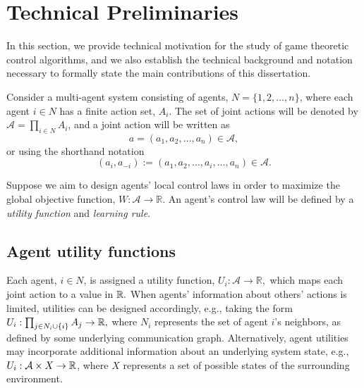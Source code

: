 


\section{Technical Preliminaries}

In this section, we provide technical motivation for the study of game theoretic control algorithms, and we also establish the technical background and notation necessary to formally state the main contributions of this dissertation.

Consider a multi-agent system consisting of agents, $N = \{1,2,\ldots,n\}$, where each agent $i\in N$ has a finite action set, $A_i$. The set of joint actions will be denoted by $\mathcal{A} = \prod_{i\in N} A_i$,  and a joint action will be written as $$a = (a_1,a_2,\ldots,a_n)\in\mathcal{A},$$ or using the shorthand notation $$(a_i,a_{-i}) := (a_1,a_2,\ldots,a_i,\ldots,a_n)\in\mathcal{A}.$$ 


Suppose we aim to design agents' local control laws in order to maximize the global objective function, $W:\mathcal{A}\to \mathbb{R}.$ An agent's control law will be defined by a {\it utility function} and {\it learning rule}.


\subsection{Agent utility functions}


Each agent, $i\in N$, is assigned a utility function, $U_i: \mathcal{A}\to\mathbb{R},$ which maps each joint action to a value in $\mathbb{R}.$  When agents' information about others' actions is limited, utilities can be designed accordingly, e.g., taking the form $U_i:\prod_{j\in N_i\cup \{i\}}A_j\to \mathbb{R},$ where $N_i$ represents the set of agent $i$'s neighbors, as defined by some underlying communication graph. Alternatively, agent utilities may incorporate additional information about an underlying system state, e.g., $U_i:\mathcal{A}\times X\to \mathbb{R}$, where $X$ represents a set of possible states of the surrounding environment.

